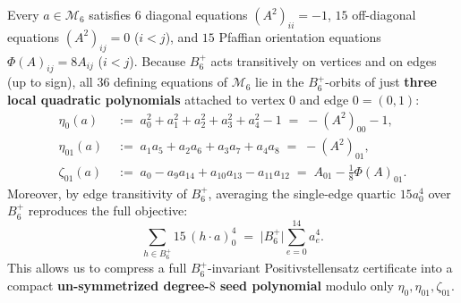 \documentclass[11pt,a4paper]{article}
\theoremstyle{plain}
\theoremstyle{definition}
\theoremstyle{remark}
\newcommand{\Mman}{\mathcal{M}_6}
\newcommand{\Bplus}{B_6^+}
\begin{document}
Every $a \in \Mman$ satisfies $6$ diagonal equations $(A^2)_{ii} = -1$, $15$ off-diagonal equations $(A^2)_{ij} = 0$ ($i < j$), and $15$ Pfaffian orientation equations $\Phi(A)_{ij} = 8 A_{ij}$ ($i < j$). Because $\Bplus$ acts transitively on vertices and on edges (up to sign), all $36$ defining equations of $\Mman$ lie in the $\Bplus$-orbits of just \textbf{three local quadratic polynomials} attached to vertex $0$ and edge $0 = (0,1)$:
\begin{align}
  \eta_0(a) &\;:=\; a_0^2 + a_1^2 + a_2^2 + a_3^2 + a_4^2 - 1 \;=\; -(A^2)_{00} - 1, \label{eq:eta0} \\
  \eta_{01}(a) &\;:=\; a_1 a_5 + a_2 a_6 + a_3 a_7 + a_4 a_8 \;=\; -(A^2)_{01}, \label{eq:eta01} \\
  \zeta_{01}(a) &\;:=\; a_0 - a_9 a_{14} + a_{10} a_{13} - a_{11} a_{12} \;=\; A_{01} - \tfrac{1}{8}\Phi(A)_{01}. \label{eq:zeta01}
\end{align}
Moreover, by edge transitivity of $\Bplus$, averaging the single-edge quartic $15 a_0^4$ over $\Bplus$ reproduces the full objective:
\begin{equation}
  \label{eq:b6-avg-a04}
  \sum_{h \in \Bplus} 15\,(h\cdot a)_0^4 \;=\; \lvert\Bplus\rvert \sum_{e=0}^{14} a_e^4.
\end{equation}
This allows us to compress a full $\Bplus$-invariant Positivstellensatz certificate into a compact \textbf{un-symmetrized degree-$8$ seed polynomial} modulo only $\eta_0, \eta_{01}, \zeta_{01}$.
\end{document}
